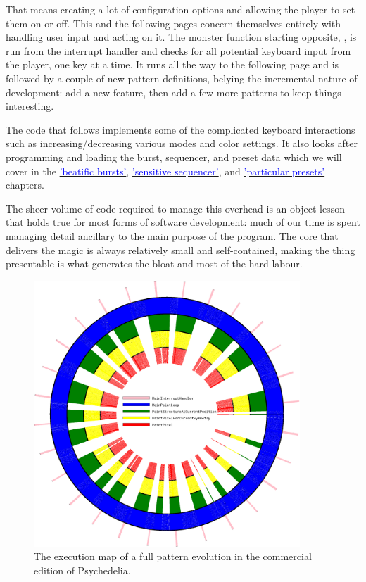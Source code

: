 That means creating a lot of configuration options and allowing the player to set them on or off. This and the following
pages concern themselves entirely with handling user input and acting on it. The monster function starting opposite,
, is run from the interrupt handler and checks for all potential keyboard input from the player,
one key at a time. It runs all the way to the following page and is followed by a couple of new pattern definitions, belying
the incremental nature of development: add a new feature, then add a few more patterns to keep things interesting.

The code that follows implements some of the complicated keyboard interactions such as increasing/decreasing various modes
and color settings. It also looks after programming and loading the burst, sequencer, and preset data which we will cover in the
\hyperref[sec:bursts]{\textcolor{blue}{'beatific bursts'}},
\hyperref[sec:sequencer]{\textcolor{blue}{'sensitive sequencer'}}, and
\hyperref[sec:presets]{\textcolor{blue}{'particular presets'}} chapters.

The sheer volume of code required to manage this overhead is an object lesson that holds true for most forms of software development:
much of our time is spent managing detail ancillary to the main purpose of the program. The core that delivers the magic is always
relatively small and self-contained, making the thing presentable is what generates the bloat and most of the hard labour.

\begin{figure}[H]                                                          
  \centering                                                             
  \begin{adjustbox}{width=8cm,center}                                   
  \includegraphics[width=10cm]{src/listing_commentary/execution_cycle.png}%
  \end{adjustbox}                                                        
\caption{The execution map of a full pattern evolution in the commercial edition of Psychedelia.}                                           
\end{figure}                                                               

